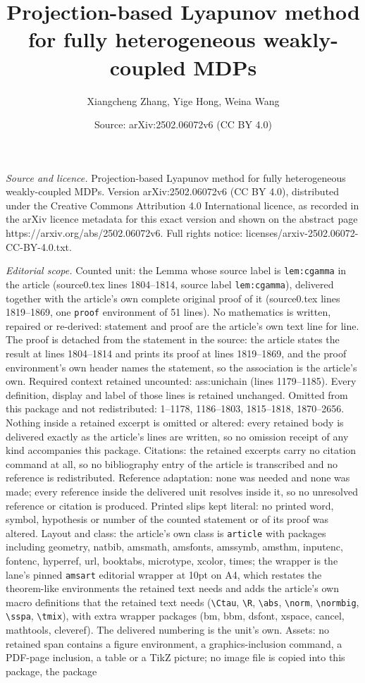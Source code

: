 \documentclass[10pt,a4paper]{amsart}
\title[Projection-based Lyapunov method for fully heterogeneous wea]{Projection-based Lyapunov method for fully heterogeneous weakly-coupled MDPs}
\author{Xiangcheng Zhang, Yige Hong, Weina Wang}
\date{Source: arXiv:2502.06072v6 (CC BY 4.0)}
\begin{document}
\maketitle

\noindent\emph{Source and licence.} Projection-based Lyapunov method for fully heterogeneous weakly-coupled MDPs. Version arXiv:2502.06072v6 (CC BY 4.0), distributed under the Creative Commons Attribution 4.0 International licence, as recorded in the arXiv licence metadata for this exact version and shown on the abstract page https://arxiv.org/abs/2502.06072v6. Full rights notice: licenses/arxiv-2502.06072-CC-BY-4.0.txt.\par\smallskip

\noindent\textit{Editorial scope.} Counted unit: the Lemma whose source label is \texttt{lem:cgamma} in the article (source0.tex lines 1804--1814, source label \texttt{lem:cgamma}), delivered together with the article's own complete original proof of it (source0.tex lines 1819--1869, one \texttt{proof} environment of 51 lines). No mathematics is written, repaired or re-derived: statement and proof are the article's own text line for line. The proof is detached from the statement in the source: the article states the result at lines 1804--1814 and prints its proof at lines 1819--1869, and the proof environment's own header names the statement, so the association is the article's own. Required context retained uncounted: ass:unichain (lines 1179--1185). Every definition, display and label of those lines is retained unchanged. Omitted from this package and not redistributed: 1--1178, 1186--1803, 1815--1818, 1870--2656. Nothing inside a retained excerpt is omitted or altered: every retained body is delivered exactly as the article's lines are written, so no omission receipt of any kind accompanies this package. Citations: the retained excerpts carry no citation command at all, so no bibliography entry of the article is transcribed and no reference is redistributed. Reference adaptation: none was needed and none was made; every reference inside the delivered unit resolves inside it, so no unresolved reference or citation is produced. Printed slips kept literal: no printed word, symbol, hypothesis or number of the counted statement or of its proof was altered. Layout and class: the article's own class is \texttt{article} with packages including geometry, natbib, amsmath, amsfonts, amssymb, amsthm, inputenc, fontenc, hyperref, url, booktabs, microtype, xcolor, times; the wrapper is the lane's pinned \texttt{amsart} editorial wrapper at 10pt on A4, which restates the theorem-like environments the retained text needs and adds the article's own macro definitions that the retained text needs (\texttt{\textbackslash Ctau}, \texttt{\textbackslash R}, \texttt{\textbackslash abs}, \texttt{\textbackslash norm}, \texttt{\textbackslash normbig}, \texttt{\textbackslash sspa}, \texttt{\textbackslash tmix}), with extra wrapper packages (bm, bbm, dsfont, xspace, cancel, mathtools, cleveref). The delivered numbering is the unit's own. Assets: no retained span contains a figure environment, a graphics-inclusion command, a PDF-page inclusion, a table or a TikZ picture; no image file is copied into this package, the package 
\end{document}
